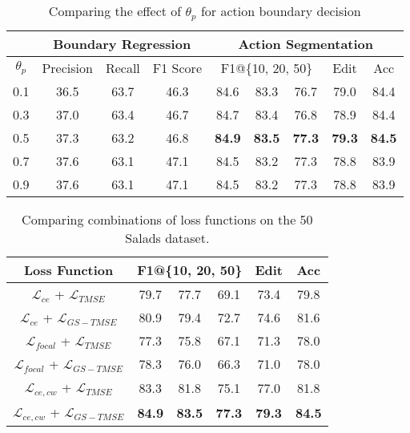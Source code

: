 \documentclass[10pt,twocolumn,letterpaper]{article}
\begin{document}
\begin{table*}[t!]
\small
\centering
\begin{tabular}{cccc|ccccc}
\hline
          & \multicolumn{3}{c}{Boundary Regression} & \multicolumn{5}{c}{Action Segmentation}                           \\ \hline
$\theta_p$ & Precision     & Recall    & F1 Score    & \multicolumn{3}{c}{F1@\{10, 20, 50\}} & Edit     & Acc            \\ \hline
0.1        & 36.5      & 63.7    & 46.3       & 84.6          & 83.3          & 76.7          & 79.0          & 84.4             \\
0.3        & 37.0      & 63.4    & 46.7       & 84.7          & 83.4          & 76.8          & 78.9          & 84.4                  \\
0.5        & 37.3      & 63.2    & 46.8       & \textbf{84.9} & \textbf{83.5} & \textbf{77.3} & \textbf{79.3} & \textbf{84.5}  \\
0.7        & 37.6      & 63.1    & 47.1       & 84.5          & 83.2          & 77.3          & 78.8          & 83.9                  \\
0.9        & 37.6      & 63.1    & 47.1       & 84.5          & 83.2          & 77.3          & 78.8          & 83.9                  \\ \hline
\end{tabular}
\caption{Comparing the effect of $\theta_p$ for action boundary decision}
\label{tab:threshold}
\vspace{-5pt}
\end{table*}


\begin{table}[t!]
\small
\centering
\begin{tabular}{c|ccccc}
\hline
Loss Function &  \multicolumn{3}{c}{F1@\{10, 20, 50\}} & Edit & Acc \\ \hline
$\mathcal{L}_{ce}$ + $\mathcal{L}_{TMSE}$              & 79.7          & 77.7          & 69.1          & 73.4          & 79.8 \\
$\mathcal{L}_{ce}$ + $\mathcal{L}_{GS-TMSE}$           & 80.9          & 79.4          & 72.7          & 74.6          & 81.6 \\
$\mathcal{L}_{focal}$ + $\mathcal{L}_{TMSE}$              & 77.3          & 75.8          & 67.1          & 71.3          & 78.0\\
$\mathcal{L}_{focal}$ + $\mathcal{L}_{GS-TMSE}$           & 78.3          & 76.0          & 66.3          & 71.0          & 78.0\\
$\mathcal{L}_{ce, cw}$ + $\mathcal{L}_{TMSE}$    & 83.3          & 81.8          & 75.1          & 77.0          & 81.8\\
$\mathcal{L}_{ce, cw}$ + $\mathcal{L}_{GS-TMSE}$ & \textbf{84.9} & \textbf{83.5} & \textbf{77.3} & \textbf{79.3} & \textbf{84.5}   \\ \hline
\end{tabular}
\caption{Comparing combinations of loss functions on the 50 Salads dataset.}
\label{tab:loss}
\end{table}
\end{document}
